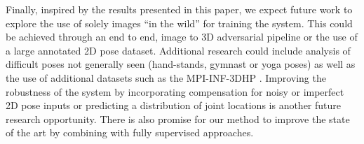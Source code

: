 \documentclass[runningheads]{llncs}
\begin{document}
Finally, inspired by the results presented in this paper, we expect future work to explore the use of solely images ``in the wild'' for training the system. This could be achieved through an end to end, image to 3D adversarial pipeline or the use of a large annotated 2D pose dataset. Additional research could include analysis of difficult poses not generally seen (hand-stands, gymnast or yoga poses) as well as the use of additional datasets such as the MPI-INF-3DHP \cite{mehta2017monocular}. Improving the robustness of the system by incorporating compensation for noisy or imperfect 2D pose inputs or predicting a distribution of joint locations is another future research opportunity. There is also promise for our method to improve the state of the art by combining with fully supervised approaches.



\clearpage



\end{document}
